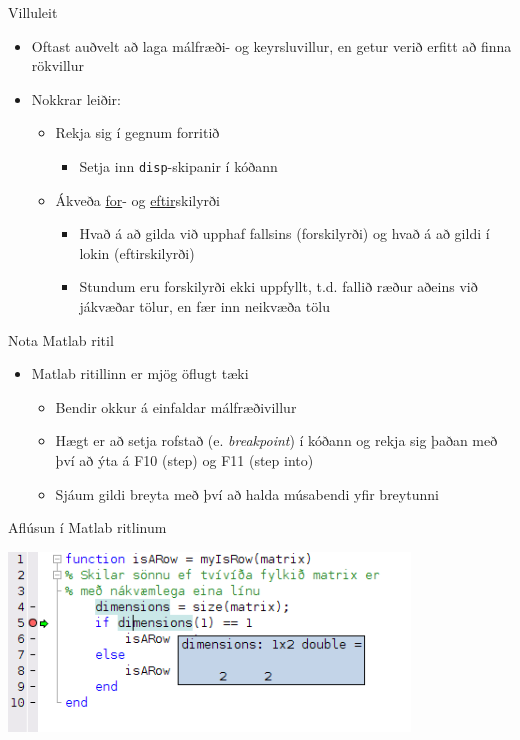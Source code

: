 \documentclass{beamer}
\begin{document}
\begin{frame}{Villuleit}
\begin{itemize}
 \item Oftast auðvelt að laga málfræði- og keyrsluvillur, en getur verið erfitt að finna rökvillur
 \item  Nokkrar leiðir:
 \begin{itemize}
  \item Rekja sig í gegnum forritið
  \begin{itemize}
   \item Setja inn \texttt{disp}-skipanir í kóðann
  \end{itemize}
 \end{itemize}
 \begin{itemize}
  \item Ákveða \underline{for}- og \underline{eftir}skilyrði
  \begin{itemize}
   \item Hvað á að gilda við upphaf fallsins (forskilyrði) og hvað á að gildi í lokin (eftirskilyrði)
   \item Stundum eru forskilyrði ekki uppfyllt, t.d. fallið ræður aðeins við jákvæðar tölur, en fær inn neikvæða tölu
  \end{itemize}
 \end{itemize}
\end{itemize}
\end{frame}

\begin{frame}{Nota Matlab ritil}
\begin{itemize}
 \item Matlab ritillinn er mjög öflugt tæki
 \begin{itemize}
  \item Bendir okkur á einfaldar málfræðivillur
  \item Hægt er að setja rofstað (e. \emph{breakpoint}) í kóðann og rekja sig þaðan með því að ýta á F10 (step) og F11 (step into)
  \item Sjáum gildi breyta með því að halda músabendi yfir breytunni
 \end{itemize}
\end{itemize}
\end{frame}

\begin{frame}{Aflúsun í Matlab ritlinum}
\begin{center}
\includegraphics[width=0.8\textwidth]{Pics/debugging}
\end{center}
\end{frame}
\end{document}
